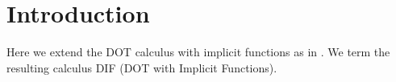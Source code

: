 \section{Introduction}

Here we extend the DOT calculus \cite{AGORS16} with implicit functions as in
\cite{OBLB18}. We term the resulting calculus DIF (DOT with Implicit Functions).
